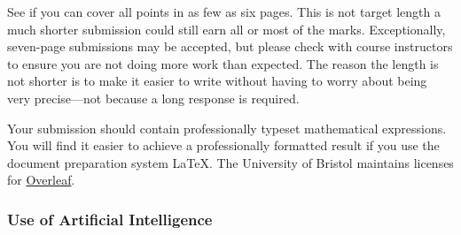 \documentclass[11pt]{article}
\begin{document}
See if you can cover all points in as few as six pages. This is not target length a much shorter submission could still earn
all or most of the marks. Exceptionally, seven-page submissions may be accepted, but please check with course instructors to ensure you are not doing more work than expected. The reason the length is not shorter is to make it easier to write without having to worry about being very
precise---not because a long response is required.

Your submission should contain professionally typeset mathematical expressions.
You will find it easier to achieve a professionally formatted result if you use the document preparation system \LaTeX. The University of Bristol maintains licenses for \href{https://www.overleaf.com}{Overleaf}. 




\vspace{-0.5\baselineskip}
\subsubsection*{Use of Artificial Intelligence}
\end{document}

